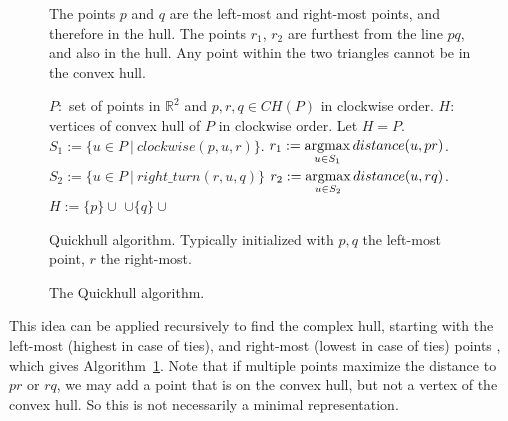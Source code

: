 \begin{figure}[ht]
\begin{minipage}[t]{0.49\textwidth}
{
    }
    \caption{The points $p$ and $q$ are the left-most and 
             right-most points, and therefore in the hull. The points $r_1$,
             $r_2$ are furthest from the line $pq$, and also in the hull. Any
             point within the two triangles cannot be in the convex hull.}
    \label{fig:quickhull}
    \end{minipage}
    \hfill
    \begin{minipage}{0.49\textwidth}
    \begin{algorithm}[H] %
    \begin{algorithmic}[1]
        \Require $P: $ set of points in $\mathbb{R}^2$ 
            and $p, r, q \in CH(P)$ in clockwise order.
        \Ensure $H: $ vertices of convex hull of $P$ in clockwise order.
            \State Let $H = P$.
        \Else
            \State $S_1 := \{u \in P \ | \ clockwise(p, u, r)\}$.
            \State $r_1 := \operatorname*{argmax}\limits_{u \in S_1}distance(u, pr)$.
            \State $S_2 := \{u \in P \ | \ right\_turn(r, u, q)\}$
            \State $r_2 := \operatorname*{argmax}\limits_{u \in S_2}distance(u, rq)$.
            \State $H := \{p\} \cup $ 
                   $\cup \{q\} \cup$ 
        \EndIf
    \end{algorithmic}
    \caption{Quickhull algorithm. Typically initialized with $p, q$ the 
             left-most point, $r$ the right-most.}
    \label{alg:quickhull_basic}
    \end{algorithm}
    \end{minipage}
    \caption{The Quickhull algorithm. }
\end{figure}

This idea can be applied recursively to find the complex hull, starting with
the left-most (highest in case of ties), and right-most (lowest in case of ties)
points \cite{Barber96}, which gives Algorithm~\ref{alg:quickhull_basic}.
Note that if multiple points maximize the distance to $pr$ or $rq$, we may add
a point that is on the convex hull, but not a vertex of the convex hull.
So this is not necessarily a minimal representation.

